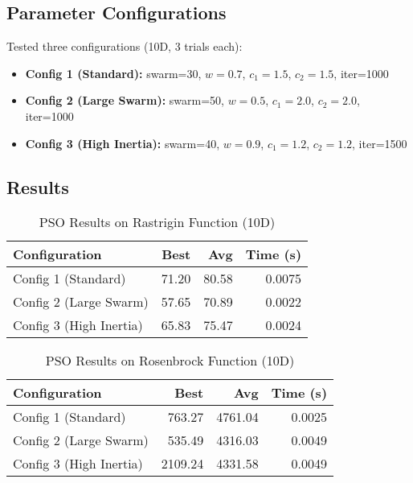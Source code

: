 \documentclass[letterpaper]{article}
\begin{document}
\subsection{Parameter Configurations}

Tested three configurations (10D, 3 trials each):

\begin{itemize}
\item \textbf{Config 1 (Standard):} swarm=30, $w=0.7$, $c_1=1.5$, $c_2=1.5$, iter=1000
\item \textbf{Config 2 (Large Swarm):} swarm=50, $w=0.5$, $c_1=2.0$, $c_2=2.0$, iter=1000
\item \textbf{Config 3 (High Inertia):} swarm=40, $w=0.9$, $c_1=1.2$, $c_2=1.2$, iter=1500
\end{itemize}

\subsection{Results}

\begin{table}[h]
\centering
\caption{PSO Results on Rastrigin Function (10D)}
\label{tab:pso-rastrigin}
\begin{tabular}{@{}lrrr@{}}
\toprule
\textbf{Configuration} & \textbf{Best} & \textbf{Avg} & \textbf{Time (s)} \\
\midrule
Config 1 (Standard) & 71.20 & 80.58 & 0.0075 \\
Config 2 (Large Swarm) & 57.65 & 70.89 & 0.0022 \\
Config 3 (High Inertia) & 65.83 & 75.47 & 0.0024 \\
\bottomrule
\end{tabular}
\end{table}

\begin{table}[h]
\centering
\caption{PSO Results on Rosenbrock Function (10D)}
\label{tab:pso-rosenbrock}
\begin{tabular}{@{}lrrr@{}}
\toprule
\textbf{Configuration} & \textbf{Best} & \textbf{Avg} & \textbf{Time (s)} \\
\midrule
Config 1 (Standard) & 763.27 & 4761.04 & 0.0025 \\
Config 2 (Large Swarm) & 535.49 & 4316.03 & 0.0049 \\
Config 3 (High Inertia) & 2109.24 & 4331.58 & 0.0049 \\
\bottomrule
\end{tabular}
\end{table}
\end{document}
